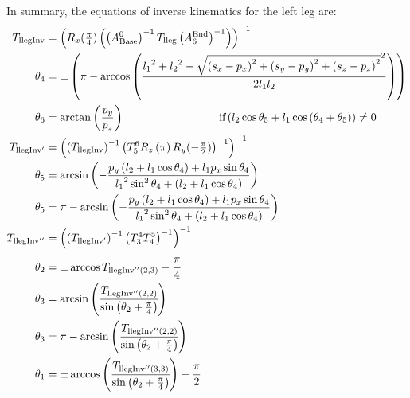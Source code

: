 In summary, the equations of inverse kinematics for the left leg are:
\begin{align*}
T_\text{llegInv} &= \left(R_x(\tfrac{\pi}{4})\left(\left(A^0_\text{Base}\right)^{-1} T_\text{lleg} \left(A^\text{End}_6\right)^{-1}\right)\right)^{-1} \\
\theta_4 &=\pm\left(\pi - \arccos\left(\frac{{l_1}^2 + {l_2}^2 - \sqrt{\left(s_x-p_x\right)^2 + \left(s_y-p_y\right)^2 + \left(s_z-p_z\right)^2}^2}{2 l_1 l_2}\right)\right) \\
\theta_6 &= \arctan\left(\frac{p_y}{p_z}\right)\hspace{3cm}\text{if} \left(l_2\cos\theta_5 + l_1 \cos\left(\theta_4 + \theta_5\right)\right) \neq 0 \\
T_{\text{llegInv}'} &= \left(\left(T_\text{llegInv}\right)^{-1}\left(T^6_5R_z\left(\pi\right)R_y(-\tfrac{\pi}{2})\right)^{-1}\right)^{-1} \\
\theta_5 &= \arcsin\left(-\frac{p_y\left(l_2+l_1\cos\theta_4\right) + l_1p_x\sin\theta_4}{{l_1}^2\sin^2\theta_4 + \left(l_2 + l_1\cos\theta_4\right)}\right) \\
\theta_5 &= \pi - \arcsin\left(-\frac{p_y\left(l_2+l_1\cos\theta_4\right) + l_1p_x\sin\theta_4}{{l_1}^2\sin^2\theta_4 + \left(l_2 + l_1\cos\theta_4\right)}\right)\\
T_{\text{llegInv}''} &= \left(\left(T_{\text{llegInv}'}\right)^{-1}\left(T^4_3T^5_4\right)^{-1}\right)^{-1} \\
\theta_2 &= \pm\arccos T_{\text{llegInv}''(2,3)} - \cfrac{\pi}{4} \\
\theta_3 &= \arcsin\left(\cfrac{T_{\text{llegInv}''(2,2)}}{\sin\left(\theta_2+\frac{\pi}{4}\right)}\right) \\
\theta_3 &= \pi - \arcsin\left(\cfrac{T_{\text{llegInv}''(2,2)}}{\sin\left(\theta_2+\frac{\pi}{4}\right)}\right) \\
\theta_1 &= \pm\arccos\left(\cfrac{T_{\text{llegInv}''(3,3)}}{\sin\left(\theta_2+\frac{\pi}{4}\right)}\right) + \cfrac{\pi}{2}
\end{align*}







